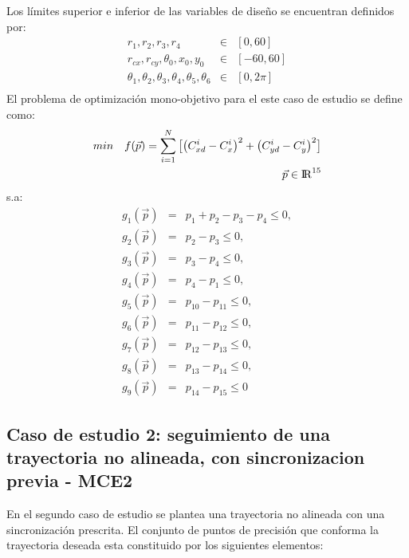 Los límites superior e inferior de las variables de diseño se encuentran definidos
por:
\begin{eqnarray}\label{eq:limites variables MEC1}
r_1,r_2,r_3,r_4& \in & \left[ 0,60\right] \\
r_{cx},r_{cy},\theta_0,x_0,y_0 & \in & \left[ -60,60\right] \\
\theta_1,\theta_2,\theta_3,\theta_4,\theta_5,\theta_6& \in & \left[ 0,2\pi \right] \\
\end{eqnarray}
El problema de optimización mono-objetivo para el este caso de estudio se define como:
 \begin{equation}\label{}
 \begin{aligned}
min\quad  f(\vec{p})=
\sum_{i=1}^{N}\big[\big(C^{i}_{xd}-C^{i}_{x} \big)^2 +\big(C^{i}_{yd}-C^{i}_{y} \big)^2\big]
\\
\vec{p} \in  {\rm I\!R}^{15}
\\
\end{aligned}
\end{equation}
s.a:
\begin{eqnarray}\label{eq:Restricciones MEC1}
g_{1}(\vec{p})&=&p_{1}+ p_{2}-p_{3}-p_{4} \leq 0,\\
g_{2}(\vec{p})&=&p_{2}-p_{3} \leq 0,\\
g_{3}(\vec{p})&=&p_{3}-p_{4} \leq 0,\\
g_{4}(\vec{p})&=&p_{4}-p_{1} \leq 0,\\
g_{5}(\vec{p})&=&p_{10}-p_{11} \leq 0,\\
g_{6}(\vec{p})&=&p_{11}-p_{12} \leq 0,\\
g_{7}(\vec{p})&=&p_{12}-p_{13} \leq 0,\\
g_{8}(\vec{p})&=&p_{13}-p_{14} \leq 0,\\
g_{9}(\vec{p})&=&p_{14}-p_{15} \leq 0
\end{eqnarray}


\subsection{Caso de estudio 2: seguimiento de una trayectoria no alineada, con
sincronizacion previa - MCE2}
En el segundo caso de estudio se plantea una trayectoria no alineada con una sincronización  prescrita. El conjunto de puntos de precisión que conforma la trayectoria deseada esta constituido por los siguientes elementos: 

